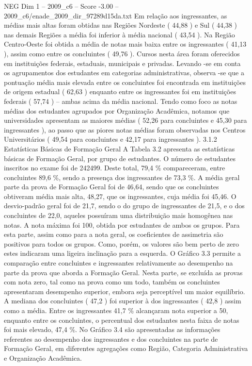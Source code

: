 \begin{textsample}{NEG Dim 1 – 2009\_c6 – Score -3.00 – 2009\_c6/enade\_2009\_dir\_97289d15da.txt}
Em relação aos ingressantes, as médias mais altas foram obtidas nas Regiões Nordeste ( 44,88 ) e Sul ( 44,38 ) nas demais Regiões a média foi inferior à média nacional ( 43,54 ).
Na Região Centro-Oeste foi obtida a média de notas mais baixa entre os ingressantes ( 41,13 ), assim como entre os concluintes ( 49,76 ).
Cursos nesta área foram oferecidos em instituições federais, estaduais, municipais e privadas.
Levando -se em conta os agrupamentos dos estudantes em categorias administrativas, observa -se que a pontuação média mais elevada entre os concluintes foi encontrada em instituições de origem estadual ( 62,63 ) enquanto entre os ingressantes foi em instituições federais ( 57,74 ) – ambas acima da média nacional.
Tendo como foco as notas médias dos estudantes agrupados por Organização Acadêmica, notamos que universidades apresentam as maiores médias ( 52,26 para concluintes e 45,30 para ingressantes ), ao passo que as piores notas médias foram observadas nos Centros Universitários ( 49,54 para concluintes e 42,17 para ingressantes ). 3.1.2 Estatísticas Básicas de Formação Geral A Tabela 3.2 apresenta as estatísticas básicas de Formação Geral, por grupo de estudantes.
O número de estudantes inscritos no exame foi de 242499.
Deste total, 79,4 \% compareceram, entre concluintes 89,6 \%, sendo a presença dos ingressantes de 73,3 \%.
A média geral parte da prova de Formação Geral foi de 46,64, sendo que os concluintes obtiveram média mais alta, 48,27, que os ingressantes, cuja média foi 45,46.
O desvio-padrão geral foi de 21,7, sendo o do grupo de ingressantes de 21,5, e o dos concluintes de 22,0, aqueles possuíram uma distribuição mais homogênea nas notas.
A nota máxima foi 100, obtida por estudantes de ambos os grupos.
Para esta parte, assim como para a nota geral, os coeficientes de assimetria são positivos para todos os grupos.
Como, porém, os valores são bem perto de zero estes indicaram uma ligeira inclinação para a esquerda.
O Gráfico 3.3 permite a comparação entre concluintes e ingressantes relativamente ao desempenho na parte da prova que aborda a Formação Geral.
Nesta parte, se excluída as provas com nota zero, tal como na prova como um todo, também os concluintes apresentaram desempenho superior, embora seja perceptível um maior equilíbrio.
A mediana dos concluintes ( 47,2 ) foi superior à dos ingressantes ( 42,8 ) assim como a média.
Entre os ingressantes 41,7 \% alcançaram nota superior a 50, enquanto entre os concluintes, o percentual dos estudantes nesta faixa de notas foi mais elevado, 47,4 \%.
No Gráfico 3.4 são apresentadas as informações referentes ao desempenho dos ingressantes e dos concluintes na parte de Formação Geral, em diferentes agregações como Região, Categoria Administrativa e Organização Acadêmica.

\end{textsample}
